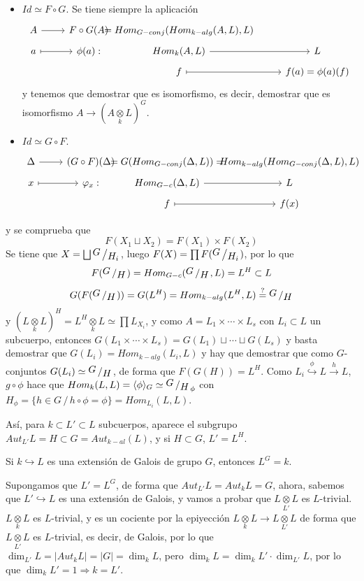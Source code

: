 \begin{itemize}
    \item \underline{$Id\simeq F\circ G$}. Se tiene siempre la aplicaci\'on 
    $$ \bt A \rar & F\circ G(A) &[-13mm] = Hom_{G-conj}(Hom_{k-alg}(A,L),L) \\[-5mm] 
    a \rarmaps & \phi(a): &[-30mm] Hom_{k}(A,L) \rar & L \\[-5mm] 
    & & f \rarmaps & f(a) = \phi(a)(f) \et$$
    y tenemos que demostrar que es isomorfismo, es decir, demostrar que es isomorfismo $A \longrightarrow (A\underset{k}{\otimes} L)^G$. 
    \item \underline{$Id\simeq G \circ F$}. 
    $$\bt \Delta \rar & (G\circ F)(\Delta) &[-13mm] = G(Hom_{G-conj}(\Delta,L)) =&[-13mm]  Hom_{k-alg}(Hom_{G-conj}(\Delta,L), L) \\[-5mm]
    x\rarmaps & \varphi_x: &[-13mm] Hom_{G-c}(\Delta, L) \rar & L \\[-5mm] 
    & & f \rarmaps & f(x) \et$$
\end{itemize}
y se comprueba que 
$$F(X_1\sqcup X_2) = F(X_1) \times F(X_2)$$
Se tiene que $X = \bigsqcup \modulo{G}{H_i}$, luego $F(X) = \prod F(\modulo{G}{H_i})$, por lo que 
$$F(\modulo{G}{H}) = Hom_{G-c}(\modulo{G}{H}, L ) = L^H \subset L$$
$$G(F(\modulo{G}{H})) = G(L^H) = Hom_{k-alg}(L^H, L) \overset{?}{=} \modulo{G}{H}$$
y $(L \underset{k}{\otimes} L)^H = L^H \underset{k}{\otimes} L \simeq \prod L_{X_i}$, y como $A = L_1 \times \cdots \times L_s$ con $L_i\subset L$ un subcuerpo, entonces $G(L_1 \times \cdots \times L_s) = G(L_1) \sqcup \cdots \sqcup G(L_s)$ y basta demostrar que $ G(L_i)= Hom_{k-alg}(L_i, L)$ y hay que demostrar que como $G$-conjuntos $G(L_i) \simeq  \modulo{G}{H}$, de forma que $F(G(H)) = L^H$. Como $L_i \overset{\phi}{\hookrightarrow} L \overset{h}{\longrightarrow} L$, $g\circ \phi$ hace que $Hom_{k}(L,L) = \langle \phi\rangle_G\simeq \modulo{G}{H}_{\phi}$ con $H_{\phi}  = \{h\in G \, / \, h\circ \phi = \phi\} = Hom_{L_i}(L,L)$.

As\'i, para $k \subset L' \subset L$ subcuerpos, aparece el subgrupo $Aut_{L'} L = H \subset G = Aut_{k-al}(L)$, y si $H\subset G$, $L ' = L^H$.

\begin{teo}
[de Artin] Si $k \hookrightarrow  L$ es una extensi\'on de Galois de grupo $G$, entonces $L^G = k$.
\end{teo}
\begin{dem}
Supongamos que $L'=L^G$, de forma que $Aut_{L'}L = Aut_k L = G$, ahora, sabemos que $L' \hookrightarrow L$ es una extensi\'on de Galois, y vamos a probar que $L  \underset{L'}{\otimes} L$ es $L$-trivial. $L \underset{k}{\otimes} L$ es $L$-trivial, y es un cociente por la epiyecci\'on 
$L \underset{k}{\otimes} L \longrightarrow L \underset{L'}{\otimes} L$ de forma que $L \underset{L'}{\otimes} L$ es $L$-trivial, es decir, de Galois, por lo que $\dim_{L'} L  = |Aut_{k} L | = |G| = \dim_k L$, pero $\dim_k L = \dim_{k} L' \cdot \dim_{L'} L$, por lo que $\dim_k L' = 1 \Rightarrow k = L'$. 
\end{dem}


